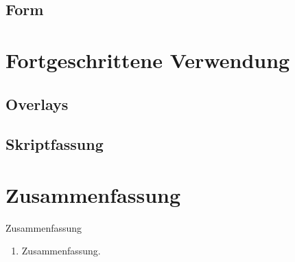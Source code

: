 



\subsection{Form}




\section{Fortgeschrittene Verwendung}

\subsection{Overlays}

\subsection{Skriptfassung}

\section*{Zusammenfassung}

\begin{frame}{Zusammenfassung}
  \begin{enumerate}
    \item Zusammenfassung.
  \end{enumerate}
\end{frame}